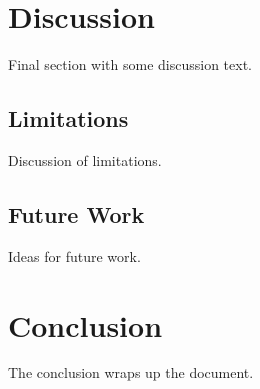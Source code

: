 \documentclass{article}
\begin{document}

\section{Discussion}
Final section with some discussion text.

\subsection{Limitations}
Discussion of limitations.

\subsection{Future Work}
Ideas for future work.

\section{Conclusion}
The conclusion wraps up the document.
\end{document}
